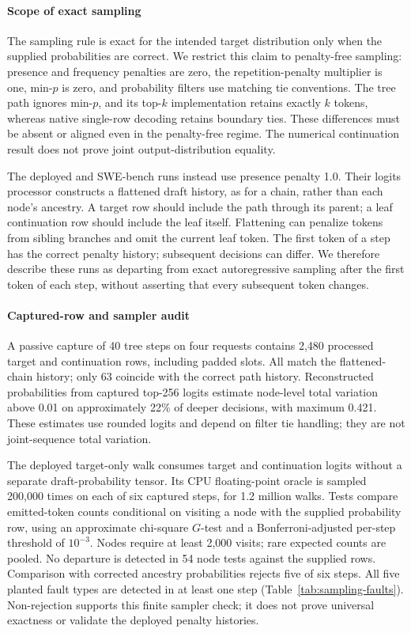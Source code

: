 \paragraph{Scope of exact sampling}
The sampling rule is exact for the intended target distribution only when the supplied probabilities are correct. We restrict this claim to penalty-free sampling: presence and frequency penalties are zero, the repetition-penalty multiplier is one, min-$p$ is zero, and probability filters use matching tie conventions. The tree path ignores min-$p$, and its top-$k$ implementation retains exactly $k$ tokens, whereas native single-row decoding retains boundary ties. These differences must be absent or aligned even in the penalty-free regime. The numerical continuation result does not prove joint output-distribution equality.

The deployed and SWE-bench runs instead use presence penalty 1.0. Their logits processor constructs a flattened draft history, as for a chain, rather than each node's ancestry. A target row should include the path through its parent; a leaf continuation row should include the leaf itself. Flattening can penalize tokens from sibling branches and omit the current leaf token. The first token of a step has the correct penalty history; subsequent decisions can differ. We therefore describe these runs as departing from exact autoregressive sampling after the first token of each step, without asserting that every subsequent token changes.

\paragraph{Captured-row and sampler audit}
A passive capture of 40 tree steps on four requests contains 2,480 processed target and continuation rows, including padded slots. All match the flattened-chain history; only 63 coincide with the correct path history. Reconstructed probabilities from captured top-256 logits estimate node-level total variation above 0.01 on approximately 22\% of deeper decisions, with maximum 0.421. These estimates use rounded logits and depend on filter tie handling; they are not joint-sequence total variation.

The deployed target-only walk consumes target and continuation logits without a separate draft-probability tensor. Its CPU floating-point oracle is sampled 200,000 times on each of six captured steps, for 1.2 million walks. Tests compare emitted-token counts conditional on visiting a node with the supplied probability row, using an approximate chi-square $G$-test and a Bonferroni-adjusted per-step threshold of $10^{-3}$. Nodes require at least 2,000 visits; rare expected counts are pooled. No departure is detected in 54 node tests against the supplied rows. Comparison with corrected ancestry probabilities rejects five of six steps. All five planted fault types are detected in at least one step (Table~\ref{tab:sampling-faults}). Non-rejection supports this finite sampler check; it does not prove universal exactness or validate the deployed penalty histories.

